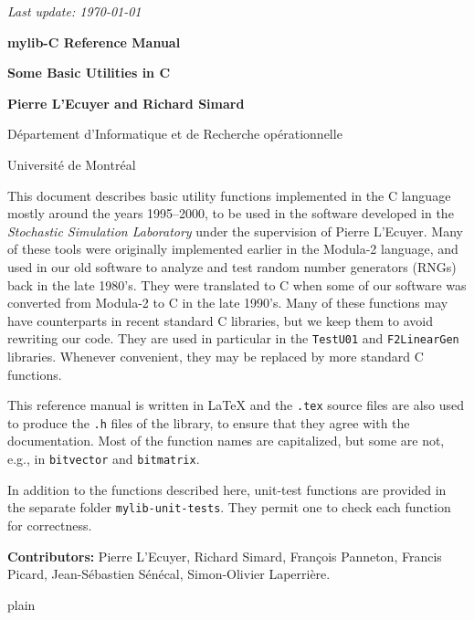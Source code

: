\documentclass[12pt]{article}
\begin{document}
\begin{titlepage}

\null 
\begin {flushright} \it Last update: \today \end {flushright}

\vfill
{ \centerline {\Large\bf mylib-C Reference Manual}\bigskip\bigskip
  \centerline {\large\bf Some Basic Utilities in C }}
\vfill

\centerline {{\bf Pierre L'Ecuyer and Richard Simard}}
\medskip
\centerline {D\'epartement d'Informatique et de Recherche op\'erationnelle}
\centerline {Universit\'e de Montr\'eal}

\vfill
\medskip

This document describes basic utility functions implemented in the 
C language mostly around the years 1995--2000, to be used in the software developed in the
\emph{Stochastic Simulation Laboratory} under the supervision of Pierre L'Ecuyer.
Many of these tools were originally implemented earlier in the Modula-2 language,
and used in our old software to analyze and test random number generators (RNGs) back 
in the late 1980's.  They were translated to C when some of our
software was converted from Modula-2 to C in the late 1990's.
Many of these functions may have counterparts in recent standard C libraries, 
but we keep them to avoid rewriting our code.
They are used in particular in the \texttt{TestU01} and \texttt{F2LinearGen} libraries.
Whenever convenient, they may be replaced by more standard C functions. 

This reference manual is written in LaTeX and the \texttt{.tex} source files 
are also used to produce the \texttt{.h} files of the library, to ensure that they agree with
the documentation.  Most of the function names are capitalized, but some are not,
e.g., in \texttt{bitvector} and \texttt{bitmatrix}.

In addition to the functions described here, unit-test functions are provided 
in the separate folder \texttt{mylib-unit-tests}. 
They permit one to check each function for correctness.  
\bigskip

\textbf{Contributors:}  Pierre L'Ecuyer, Richard Simard, Fran\c cois Panneton,
Francis Picard, Jean-S\'ebastien S\'en\'ecal, Simon-Olivier Laperri\`ere.

\vfill
\end{titlepage}

\tableofcontents
{}

\clearpage
\clearpage
\clearpage
\clearpage
\clearpage
\clearpage
\clearpage
\clearpage
\clearpage
\clearpage
\clearpage
\clearpage
\clearpage
\clearpage

\clearpage
 {plain}

\end{document}
